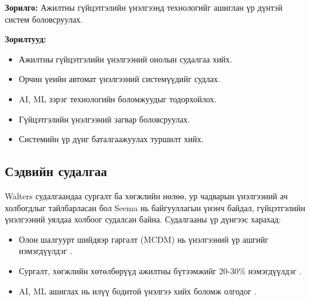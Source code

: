 \textbf{Зорилго:} Ажилтны гүйцэтгэлийн үнэлгээнд технологийг ашиглан үр дүнтэй систем боловсруулах.

\textbf{Зорилтууд:}
\begin{itemize}
    \item Ажилтны гүйцэтгэлийн үнэлгээний онолын судалгаа хийх.
    \item Орчин үеийн автомат үнэлгээний системүүдийг судлах.
    \item AI, ML зэрэг технологийн боломжуудыг тодорхойлох.
    \item Гүйцэтгэлийн үнэлгээний загвар боловсруулах.
    \item Системийн үр дүнг баталгаажуулах туршилт хийх.
\end{itemize}

\subsection{Сэдвийн судалгаа}
Walters \cite{walters2019} судалгаандаа сургалт ба хөгжлийн нөлөө, ур чадварын үнэлгээний ач холбогдлыг тайлбарласан бол Seema \cite{seema2017} нь байгууллагын үнэнч байдал, гүйцэтгэлийн үнэлгээний уялдаа холбоог судалсан байна. Судалгааны үр дүнгээс харахад:
\begin{itemize}
    \item Олон шалгуурт шийдвэр гаргалт (MCDM) нь үнэлгээний үр ашгийг нэмэгдүүлдэг \cite{springer2012}.
    \item Сургалт, хөгжлийн хөтөлбөрүүд ажилтны бүтээмжийг 20-30\% нэмэгдүүлдэг \cite{walters2019}.
    \item AI, ML ашиглах нь илүү бодитой үнэлгээ хийх боломж олгодог \cite{citeseerx2018}.
\end{itemize}